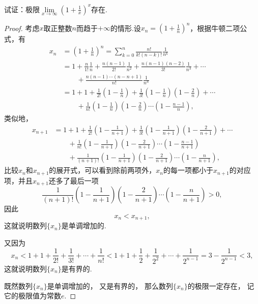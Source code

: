 \begin{example}[重要极限II]
试证：极限\(\lim\limits_{x \to \infty}\left(1 + \frac{1}{x}\right)^x\)存在.
\begin{proof}
考虑\(x\)取正整数\(n\)而趋于\(+\infty\)的情形.设\(x_n=\left(1+\frac{1}{n}\right)^n\)，根据牛顿二项公式，有\begin{align*}
x_n &= \left(1+\frac{1}{n}\right)^n
= \sum\limits_{k=0}^n \frac{n!}{k! (n-k)!} \frac{1}{n^k} \\
&= 1 + \frac{n}{1!}\frac{1}{n} + \frac{n(n-1)}{2!}\frac{1}{n^2} + \frac{n(n-1)(n-2)}{3!}\frac{1}{n^3} + \dotsb \\
&\qquad+ \frac{n(n-1)\dotsm(n-n+1)}{n!}\frac{1}{n^n} \\
&= 1 + 1 + \frac{1}{2!}\left(1-\frac{1}{n}\right) + \frac{1}{3!}\left(1-\frac{1}{n}\right)\left(1-\frac{2}{n}\right) + \dotsb \\
&\qquad+ \frac{1}{n!}\left(1-\frac{1}{n}\right)\left(1-\frac{2}{n}\right)\dotsm\left(1-\frac{n-1}{n}\right),
\end{align*}
类似地，\begin{align*}
x_{n+1}
&= 1 + 1 + \frac{1}{2!}\left(1-\frac{1}{n+1}\right) + \frac{1}{3!}\left(1-\frac{1}{n+1}\right)\left(1-\frac{2}{n+1}\right) + \dotsb \\
&\qquad+ \frac{1}{n!}\left(1-\frac{1}{n+1}\right)\left(1-\frac{2}{n+1}\right)\dotsm\left(1-\frac{n-1}{n+1}\right) \\
&\qquad+ \frac{1}{(n+1)!}\left(1-\frac{1}{n+1}\right)\left(1-\frac{2}{n+1}\right)\dotsm\left(1-\frac{n}{n+1}\right),
\end{align*}
比较\(x_n\)和\(x_{n+1}\)的展开式，可以看到除前两项外，\(x_n\)的每一项都小于\(x_{n+1}\)的对应项，并且\(x_{n+1}\)还多了最后一项\[
\frac{1}{(n+1)!}\left(1-\frac{1}{n+1}\right)\left(1-\frac{2}{n+1}\right)\dotsm\left(1-\frac{n}{n+1}\right) > 0,
\]因此\[
x_n < x_{n+1},
\]这就说明数列\(\{x_n\}\)是单调增加的.

又因为\[
x_n < 1 + 1 + \frac{1}{2!} + \frac{1}{3!} + \dotsb + \frac{1}{n!}
< 1 + 1 + \frac{1}{2} + \frac{1}{2^2} + \dotsb + \frac{1}{2^{n-1}}
= 3 - \frac{1}{2^{n-1}} < 3,
\]这就说明数列\(\{x_n\}\)是有界的.

既然数列\(\{x_n\}\)是单调增加的，%
又是有界的，%
那么数列\(\{x_n\}\)的极限一定存在，%
记它的极限值为常数\(e\).


\end{proof}
\end{example}

